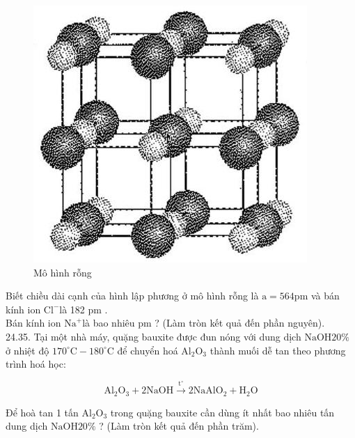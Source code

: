 \documentclass[10pt]{article}
\begin{document}
\begin{figure}[h]
\begin{center}
  \includegraphics[width=\textwidth]{2025_10_23_74efce88ce3a451fd6b0g-081(2)}
\captionsetup{labelformat=empty}
\caption{Mô hình rỗng}
\end{center}
\end{figure}

Biết chiều dài cạnh của hình lập phương ở mô hình rỗng là $\mathrm{a}=564 \mathrm{pm}$ và bán kính ion $\mathrm{Cl}^{-}$là 182 pm .\\
Bán kính ion $\mathrm{Na}^{+}$là bao nhiêu pm ? (Làm tròn kết quả đến phần nguyên).\\
24.35. Tại một nhà máy, quặng bauxite được đun nóng với dung dịch $\mathrm{NaOH} 20 \%$ ở nhiệt độ $170^{\circ} \mathrm{C}-180^{\circ} \mathrm{C}$ để chuyển hoá $\mathrm{Al}_{2} \mathrm{O}_{3}$ thành muối dễ tan theo phương trình hoá học:

$$
\mathrm{Al}_{2} \mathrm{O}_{3}+2 \mathrm{NaOH} \xrightarrow{\mathrm{t}^{\circ}} 2 \mathrm{NaAlO}_{2}+\mathrm{H}_{2} \mathrm{O}
$$

Để hoà tan 1 tấn $\mathrm{Al}_{2} \mathrm{O}_{3}$ trong quặng bauxite cần dùng ít nhất bao nhiêu tấn dung dịch $\mathrm{NaOH} 20 \%$ ? (Làm tròn kết quả đến phần trăm).
\end{document}
